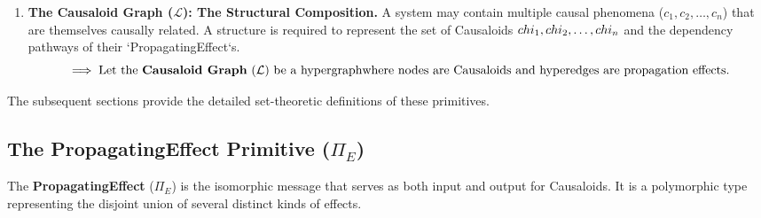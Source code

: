 \begin{enumerate}
    \item \textbf{The Causaloid Graph ($\mathcal{L}$): The Structural Composition.}\newline
    A system may contain multiple causal phenomena ($c_1, c_2, \dots, c_n$) that are themselves causally related.
     A structure is required to represent the set of Causaloids {$\\chi_1, \\chi_2, \dots, \\chi_n$} and the dependency pathways of their `PropagatingEffect`s.
    \begin{equation*}
        \implies \text{Let the \textbf{Causaloid Graph} ($\mathcal{L}$) be a hypergraph\newline
         where nodes are Causaloids and hyperedges are propagation effects.}
    \end{equation*}

\end{enumerate}

\noindent The subsequent sections provide the detailed set-theoretic definitions of these primitives.

\newpage
\subsection{The PropagatingEffect Primitive (\(\Pi_E\))}
\label{sec:propagating_effect_formal}

The \textbf{PropagatingEffect} (\(\Pi_E\)) is the isomorphic message that serves as both input and output for Causaloids. 
It is a polymorphic type representing the disjoint union of several distinct kinds of effects.\newline

